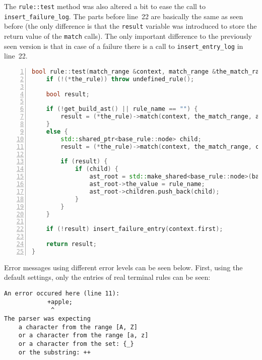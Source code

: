 \documentclass[12pt]{article}
\begin{document}
The \texttt{rule::test} method was also altered a bit to ease the call to \texttt{insert\_failure\_log}. The
parts before line~22 are basically the same as seen before (the only difference is that the \texttt{result}
variable was introduced to store the return value of the \texttt{match} calls). The only important difference
to the previously seen version is that in case of a failure there is a call to \texttt{insert\_entry\_log} in
line~22.

\begin{center}
	\begin{minipage}[ht]{0.9\textwidth}
		\begin{lstlisting}[language=C++, breaklines=true, numbers=left]
bool rule::test(match_range &context, match_range &the_match_range, std::shared_ptr<base_rule::node> &ast_root) {
	if (!(*the_rule)) throw undefined_rule();

	bool result;

	if (!get_build_ast() || rule_name == "") {
		result = (*the_rule)->match(context, the_match_range, ast_root);
	}
	else {
		std::shared_ptr<base_rule::node> child;
		result = (*the_rule)->match(context, the_match_range, child);

		if (result) {
			if (child) {
				ast_root = std::make_shared<base_rule::node>(base_rule::node::type::named_rule);
				ast_root->the_value = rule_name;
				ast_root->children.push_back(child);
			}
		}
	}

	if (!result) insert_failure_entry(context.first);

	return result;
}
		\end{lstlisting}
	\end{minipage}
\end{center}

Error messages using different error levels can be seen below. First, using the default settings, only the
entries of real terminal rules can be seen:
\begin{center}
	\begin{minipage}[ht]{0.8\textwidth}
		\begin{lstlisting}[breaklines=true]
An error occured here (line 11):
			+apple;
			 ^
The parser was expecting
	a character from the range [A, Z]
	or a character from the range [a, z]
	or a character from the set: {_}
	or the substring: ++
		\end{lstlisting}
	\end{minipage}
\end{center}
\end{document}
